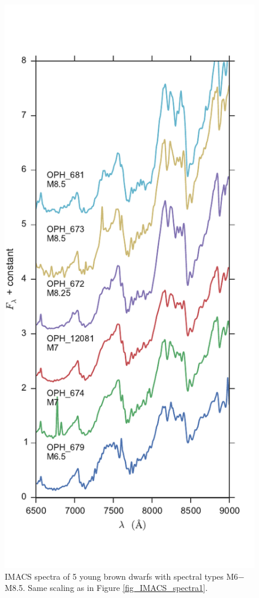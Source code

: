 \begin{figure}[ht!]
\caption{IMACS spectra of 5 young brown dwarfs with spectral types M6$-$M8.5.  Same scaling as in Figure \ref{fig_IMACS_spectra1}. \label{fig_IMACS_spectra2} }
\centering
\includegraphics[scale=0.65]{chIMACS/figures/IMACS_spectra_M6_M8p5}
\end{figure}


